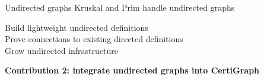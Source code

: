 \documentclass[usenames, xcolor=dvipsnames]{beamer}
\newcommand{\hide}[1]{}
\newcommand{\m}[1]{\ensuremath{\mathit{#1}}} %
\begin{document}
\begin{frame}[fragile]{Undirected graphs}
Kruskal and Prim handle undirected graphs \\

\pause \vspace{0.9em}

\quad Build lightweight undirected definitions \\
\pause
\quad Prove connections to existing directed definitions \\
\pause
\quad Grow undirected infrastructure
\pause

\vspace{1.0em}

{\centering \textbf{Contribution 2: integrate undirected graphs into CertiGraph}}


\end{frame}

\hide{
\begin{frame}{Weakening directed into undirected}

\m{x} and \m{y} are $\texttt{adjacent}^{u}$ if there is an $\texttt{edge}^{d}$ between them: \\
\hspace{1em} \m{x} $\rightarrow$ \m{y} or \m{y} $\rightarrow$ \m{x} \\

\pause \bigskip

$\texttt{connected}^{u}$ is the transitive closure of $\texttt{adjacent}^{u}$: \\
\hspace{1em} \m{x} $\rightsquigarrow$ \m{a} $\leftarrow$ \m{b} $\leftarrow$ \m{c} $\leftsquigarrow$ \m{y} \\

\pause \bigskip

We already have $\texttt{reachable}^{d}$: \hspace{0.5em} \m{x} $\rightsquigarrow$ \m{y} \\
\pause
By design, $\texttt{reachable}^{d}$ weakens easily into $\texttt{connected}^{u}$

\pause \bigskip

$\texttt{connected}^{u}$ is powerful enough to define \\
$\texttt{cycle}^{u}$, $\texttt{forest}^{u}$, $\texttt{spanning}^{u}$, $\ldots$ ,
$\texttt{minimum\_spanning\_forest}^{u}$

\end{frame}
}
\end{document}
